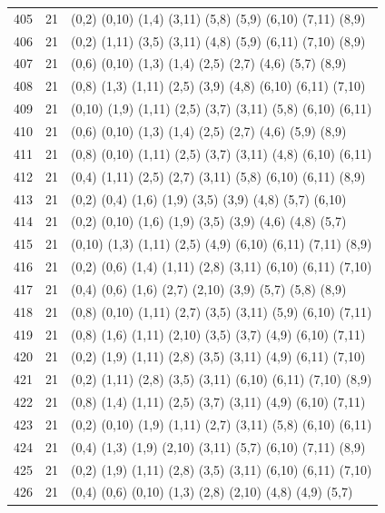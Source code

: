 \begin{appendix}
{\begin{longtable}{lll}
405& 21 & (0,2)   (0,10) (1,4)  (3,11)  (5,8)   (5,9)   (6,10)  (7,11)  (8,9)\\
406& 21 & (0,2)   (1,11) (3,5)  (3,11)  (4,8)   (5,9)   (6,11)  (7,10)  (8,9)\\
407& 21 & (0,6)   (0,10) (1,3)  (1,4)   (2,5)   (2,7)   (4,6)   (5,7)   (8,9)\\
408& 21 & (0,8)   (1,3)  (1,11) (2,5)   (3,9)   (4,8)   (6,10)  (6,11)  (7,10)\\
409& 21 & (0,10)  (1,9)  (1,11) (2,5)   (3,7)   (3,11)  (5,8)   (6,10)  (6,11)\\
410& 21 & (0,6)   (0,10) (1,3)  (1,4)   (2,5)   (2,7)   (4,6)   (5,9)   (8,9)\\
411& 21 & (0,8)   (0,10) (1,11) (2,5)   (3,7)   (3,11)  (4,8)   (6,10)  (6,11)\\
412& 21 & (0,4)   (1,11) (2,5)  (2,7)   (3,11)  (5,8)   (6,10)  (6,11)  (8,9)\\
413& 21 & (0,2)   (0,4)  (1,6)  (1,9)   (3,5)   (3,9)   (4,8)   (5,7)   (6,10)\\
414& 21 & (0,2)   (0,10) (1,6)  (1,9)   (3,5)   (3,9)   (4,6)   (4,8)   (5,7)\\
415& 21 & (0,10)  (1,3)  (1,11) (2,5)   (4,9)   (6,10)  (6,11)  (7,11)  (8,9)\\
416& 21 & (0,2)   (0,6)  (1,4)  (1,11)  (2,8)   (3,11)  (6,10)  (6,11)  (7,10)\\
417& 21 & (0,4)   (0,6)  (1,6)  (2,7)   (2,10)  (3,9)   (5,7)   (5,8)   (8,9)\\
418& 21 & (0,8)   (0,10) (1,11) (2,7)   (3,5)   (3,11)  (5,9)   (6,10)  (7,11)\\
419& 21 & (0,8)   (1,6)  (1,11) (2,10)  (3,5)   (3,7)   (4,9)   (6,10)  (7,11)\\
420& 21 & (0,2)   (1,9)  (1,11) (2,8)   (3,5)   (3,11)  (4,9)   (6,11)  (7,10)\\
421& 21 & (0,2)   (1,11) (2,8)  (3,5)   (3,11)  (6,10)  (6,11)  (7,10)  (8,9)\\
422& 21 & (0,8)   (1,4)  (1,11) (2,5)   (3,7)   (3,11)  (4,9)   (6,10)  (7,11)\\
423& 21 & (0,2)   (0,10) (1,9)  (1,11)  (2,7)   (3,11)  (5,8)   (6,10)  (6,11)\\
424& 21 & (0,4)   (1,3)  (1,9)  (2,10)  (3,11)  (5,7)   (6,10)  (7,11)  (8,9)\\
425& 21 & (0,2)   (1,9)  (1,11) (2,8)   (3,5)   (3,11)  (6,10)  (6,11)  (7,10)\\
426& 21 & (0,4)   (0,6)  (0,10) (1,3)   (2,8)   (2,10)  (4,8)   (4,9)   (5,7)\\

\end{longtable}}
\end{appendix}
